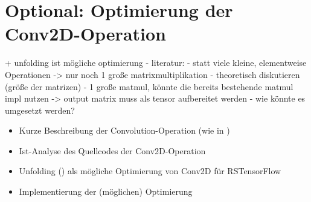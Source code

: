 \section{Optional: Optimierung der Conv2D-Operation}
\label{sec:optimierungconv2d}
+ unfolding ist mögliche optimierung
	- literatur: 
	- statt viele kleine, elementweise Operationen -> nur noch 1 große matrixmultiplikation
		- theoretisch diskutieren (größe der matrizen)
		- 1 große matmul, könnte die bereits bestehende matmul impl nutzen -> output matrix muss als tensor aufbereitet werden
	- wie könnte es umgesetzt werden?

\begin{itemize}
	\item{Kurze Beschreibung der Convolution-Operation (wie in \cite{stanford-CS231n})}
	\item{Ist-Analyse des Quellcodes der Conv2D-Operation}
	\item{Unfolding (\cite{conv2d-optimizing-unfolding}) als mögliche Optimierung von Conv2D für RSTensorFlow}
	\item{Implementierung der (möglichen) Optimierung}
\end{itemize}